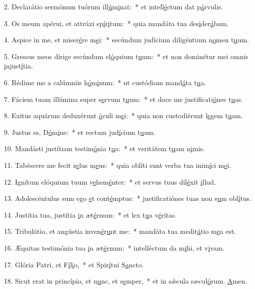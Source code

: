 2. Declarátio sermónum tuórum ill\uline{ú}m\uline{i}nat:~* et intell\uline{é}ctum dat p\uline{á}rvulis.\par 
3. Os meum apérui, et attráxi sp\uline{í}r\uline{i}tum:~* quia mandáta tua des\uline{i}der\uline{á}bam.\par 
4. Aspice in me, et miser\uline{é}re m\uline{e}i:~* secúndum judícium diligéntium n\uline{o}men t\uline{u}um.\par 
5. Gressus meos dírige secúndum el\uline{ó}quium t\uline{u}um:~* et non dominétur mei omnis \uline{i}njust\uline{í}tia.\par 
6. Rédime me a calúmniis h\uline{ó}m\uline{i}num:~* ut custódiam mand\uline{á}ta t\uline{u}a.\par 
7. Fáciem tuam illúmina super s\uline{e}rvum t\uline{u}um:~* et doce me justificati\uline{ó}nes t\uline{u}as.\par 
8. Exitus aquárum deduxérunt \uline{ó}culi m\uline{e}i:~* quia non custodiérunt l\uline{e}gem t\uline{u}am.\par 
9. Justus es, D\uline{ó}m\uline{i}ne:~* et rectum jud\uline{í}cium t\uline{u}um.\par 
10. Mandásti justítiam testim\uline{ó}nia t\uline{u}a:~* et veritátem t\uline{u}am n\uline{i}mis.\par 
11. Tabéscere me fecit z\uline{e}lus m\uline{e}us:~* quia oblíti sunt verba tua inim\uline{í}ci m\uline{e}i.\par 
12. Ignítum elóquium tuum v\uline{e}hem\uline{é}nter:~* et servus tuus dil\uline{é}xit \uline{i}llud.\par 
13. Adolescéntulus sum ego \uline{e}t cont\uline{é}mptus:~* justificatiónes tuas non s\uline{u}m obl\uline{í}tus.\par 
14. Justítia tua, justítia \uline{i}n æt\uline{é}rnum:~* et lex t\uline{u}a v\uline{é}ritas.\par 
15. Tribulátio, et angústia inven\uline{é}r\uline{u}nt me:~* mandáta tua medit\uline{á}tio m\uline{e}a est.\par 
16. Æquitas testimónia tua \uline{i}n æt\uline{é}rnum:~* intelléctum da m\uline{i}hi, et v\uline{i}vam.\par 
17. Glória Patri, et F\uline{í}l\uline{i}o,~* et Spir\uline{í}tui S\uline{a}ncto.\par 
18. Sicut erat in princípio, et n\uline{u}nc, et s\uline{e}mper,~* et in sǽcula sæcul\uline{ó}rum. \uline{A}men.\par 
